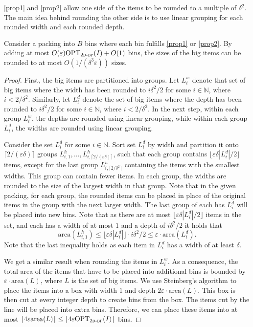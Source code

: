 \documentclass[a4paper,UKenglish,cleveref, autoref, thm-restate]{lipics-v2021}
\newcommand{\eps}{\varepsilon}
\newcommand{\opt}{\mathrm{OPT}}
\newcommand{\twobp}{\textsc{2d-bp}\xspace}
\newcommand{\bigy}{big\xspace}
\newcommand{\area}{\mathrm{area}}
\begin{document}
\cref{prop1} and \cref{prop2} allow one side of the items to be rounded to a multiple of $\delta^2$. The main idea behind rounding the other side is to use linear grouping for each rounded width and each rounded depth.

\begin{lemma}
\label{lem:rounding-large-items-two-bp}
Consider a packing into $B$ bins where each bin fulfills \cref{prop1} or \cref{prop2}.
By adding at most 
$O(\eps) \opt_{\twobp}(I) +O(1)$
bins, the sizes of the \bigy items can be rounded to at most $O(1/(\delta^3\eps))$ sizes.
\end{lemma}

\begin{proof}
    First, the \bigy items are partitioned into groups. 
    Let $L_i^w$ denote that set of \bigy items where the width has been rounded to $i \delta^2/2$ for some $i \in \mathbb{N}$, where $i < 2/\delta^2$.
    Similarly, let $L_i^d$ denote the set of \bigy items where the depth has been rounded to $i \delta^2/2$ for some $i \in \mathbb{N}$, where $i < 2/\delta^2$.
    In the next step, within each group $L_i^w$, the depths are rounded using linear grouping, while within each group $L_i^d$, the widths are rounded using linear grouping.

    Consider the set $L_i^d$ for some $i \in \mathbb{N}$. 
    Sort set $L_i^d$ by width and partition it onto $\lceil 2/(\eps\delta) \rceil$ groups $L_{i,1}^h,\dots, L_{i,\lceil 2/(\eps\delta) \rceil}^h$, such that each group contains $\lfloor\eps\delta|L_i^d|/2 \rfloor$ items, except for the last group $L_{i,\lceil 2/\delta^2 \rceil}^h$ containing the items with the smallest widths. 
    This group can contain fewer items. 
    In each group, the widths are rounded to the size of the largest width in that group.
    Note that in the given packing, for each group, the rounded items can be placed in place of the original items in the group with the next larger width.
    The last group of each has $L_i^d$ will be placed into new bins.
    Note that as there are at most $\lfloor\eps\delta|L_i^d|/2 \rfloor$ items in the set, and each has a width of at most $1$ and a depth of $i \delta^2/2$ it holds that
    \[\area(L_{i,1}^h) \leq \lfloor\eps\delta|L_i^d| \rfloor \cdot i \delta^2/2\leq \eps\cdot \area(L_i^d).\] 
    Note that the last inequality holds as each item in $L_i^d$ has a width of at least $\delta$.
    
    We get a similar result when rounding the items in $L_i^w$.
    As a consequence, the total area of the items that have to be placed into additional bins is bounded by $\eps \cdot \area(L)$, where $L$ is the set of \bigy items. 
    We use Steinberg's algorithm \cite{steinberg1997strip} to place the items into a box with width $1$ and depth $2\eps\cdot \area(L)$. This box is then cut at every integer depth to create bins from the box. The items cut by the line will be placed into extra bins. Therefore, we can place these items into at most $\lceil 4 \eps \area (L) \rceil \leq \lceil4 \eps \opt_{\twobp}(I)\rceil$ bins.
\end{proof}
\end{document}
